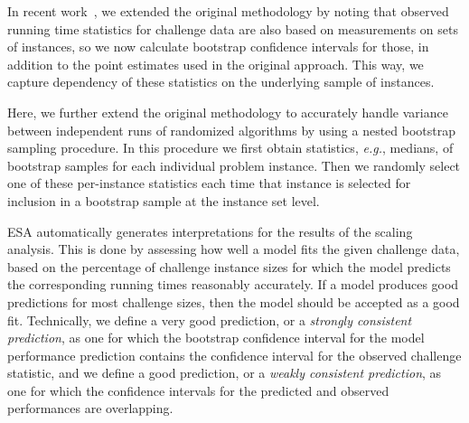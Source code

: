 \documentclass[aic]{iosart2x}
\newcommand{\eg}{\emph{e.g.}}
\begin{document}
In recent work~\cite{MuHoo15}, we extended the original methodology by noting that observed running time statistics for challenge data are also based on measurements on sets of instances, so we now calculate bootstrap confidence intervals for those, in addition to the point estimates used in the original approach. This way, we capture dependency of these statistics on the underlying sample of instances.

Here, we further extend the original methodology to accurately handle variance between independent runs of randomized algorithms by using a nested bootstrap sampling procedure. In this procedure we first obtain statistics, \eg{}, medians, of bootstrap samples for each individual problem instance. Then we randomly select one of these per-instance statistics each time that instance is selected for inclusion in a bootstrap sample at the instance set level. 


\label{sec:auto-interpretation}

ESA automatically generates interpretations for the results of the scaling analysis. This is done by assessing how well a model fits the given challenge data, based on the percentage of challenge instance sizes for which the model predicts the corresponding running times reasonably accurately. If a model produces good predictions for most challenge sizes, then the model should be accepted as a good fit. Technically, we define a very good prediction, or a \emph{strongly consistent prediction}, as one for which the bootstrap confidence interval for the model performance prediction contains the confidence interval for the observed challenge statistic, and we define a good prediction, or a \emph{weakly consistent prediction}, as one for which the confidence intervals for the predicted and observed performances are overlapping.
\end{document}
